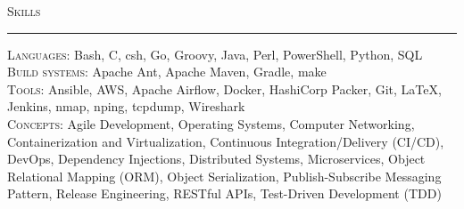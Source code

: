 \documentclass{res}
\begin{document}
\begin{resume}
\textsc{{\Large Skills}}
\vspace{0.5mm}
\hrule width18.5cm
\textsc{Languages:} Bash, C, csh, Go, Groovy, Java, Perl, PowerShell, Python, SQL\\[2mm]
\textsc{Build systems:} Apache Ant, Apache Maven, Gradle, make\\[2mm]
\textsc{Tools:} Ansible, AWS, Apache Airflow, Docker, HashiCorp Packer, Git, \LaTeX, Jenkins, nmap, nping, tcpdump, Wireshark\\[2mm]
\textsc{Concepts:} Agile Development, Operating Systems, Computer Networking, Containerization and Virtualization, Continuous Integration/Delivery (CI/CD), DevOps, Dependency Injections, Distributed Systems, Microservices, Object Relational Mapping (ORM), Object Serialization, Publish-Subscribe Messaging Pattern, Release Engineering, RESTful APIs, Test-Driven Development (TDD)\\[0.5mm]
\vspace{-2mm}
\end{resume}
\end{document}
